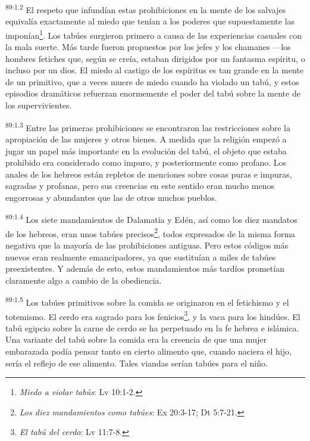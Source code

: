 \par
\textsuperscript{89:1.2} El respeto que infundían estas prohibiciones en la mente de los salvajes equivalía exactamente al miedo que tenían a los poderes que supuestamente las imponían\footnote{\textit{Miedo a violar tabús}: Lv 10:1-2.}. Los tabúes surgieron primero a causa de las experiencias casuales con la mala suerte. Más tarde fueron propuestos por los jefes y los chamanes ---los hombres fetiches que, según se creía, estaban dirigidos por un fantasma espíritu, o incluso por un dios. El miedo al castigo de los espíritus es tan grande en la mente de un primitivo, que a veces muere de miedo cuando ha violado un tabú, y estos episodios dramáticos refuerzan enormemente el poder del tabú sobre la mente de los supervivientes.

\par
\textsuperscript{89:1.3} Entre las primeras prohibiciones se encontraron las restricciones sobre la apropiación de las mujeres y otros bienes. A medida que la religión empezó a jugar un papel más importante en la evolución del tabú, el objeto que estaba prohibido era considerado como impuro, y posteriormente como profano. Los anales de los hebreos están repletos de menciones sobre cosas puras e impuras, sagradas y profanas, pero sus creencias en este sentido eran mucho menos engorrosas y abundantes que las de otros muchos pueblos.

\par
\textsuperscript{89:1.4} Los siete mandamientos de Dalamatia y Edén, así como los diez mandatos de los hebreos, eran unos tabúes precisos\footnote{\textit{Los diez mandamientos como tabúes}: Ex 20:3-17; Dt 5:7-21.}, todos expresados de la misma forma negativa que la mayoría de las prohibiciones antiguas. Pero estos códigos más nuevos eran realmente emancipadores, ya que sustituían a miles de tabúes preexistentes. Y además de esto, estos mandamientos más tardíos prometían claramente algo a cambio de la obediencia.

\par
\textsuperscript{89:1.5} Los tabúes primitivos sobre la comida se originaron en el fetichismo y el totemismo. El cerdo era sagrado para los fenicios\footnote{\textit{El tabú del cerdo}: Lv 11:7-8.}, y la vaca para los hindúes. El tabú egipcio sobre la carne de cerdo se ha perpetuado en la fe hebrea e islámica. Una variante del tabú sobre la comida era la creencia de que una mujer embarazada podía pensar tanto en cierto alimento que, cuando naciera el hijo, sería el reflejo de ese alimento. Tales viandas serían tabúes para el niño.

